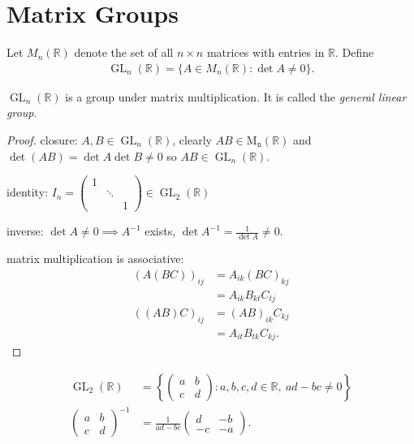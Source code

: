 \section{Matrix Groups}

Let $M_n(\mathbb{R})$ denote the set of all $n \times n$ matrices with entries in $\mathbb{R}$. Define
\begin{align*}
    \operatorname{GL}_n(\mathbb{R}) = \{A \in M_n(\mathbb{R}) : \det A \neq 0\}.
\end{align*} 

\begin{proposition} \label{prp:8}
    $\operatorname{GL}_n(\mathbb{R})$ is a group under matrix multiplication.
    It is called the \emph{general linear group}.
\end{proposition} 

\begin{proof}
    closure: $A, B \in \operatorname{GL}_n(\mathbb{R})$, clearly $AB \in \operatorname{M_n}(\mathbb{R})$ and $\det(AB) = \det A \det B \neq 0$ so $AB \in \operatorname{GL}_n(\mathbb{R})$.

    identity: $I_n = \begin{pmatrix}
        1 & & \\
        & \ddots &  \\
        & & 1
      \end{pmatrix} \in \operatorname{GL}_2(\mathbb{R})$

    inverse: $\det A \neq 0 \implies A^{-1}$ exists, $\det A^{-1} = \frac{1}{\det A} \neq 0$.

    matrix multiplication is associative: 
    \begin{align*}
        (A(BC))_{ij} &= A_{ik} (BC)_{kj} \\
        &= A_{ik} B_{kt} C_{tj} \\
        ((AB)C)_{ij} &= (AB)_{ik} C_{kj} \\
        &= A_{it} B_{tk} C_{kj}.
    \end{align*} 
\end{proof} 

\begin{example}
    \begin{align*}
        \operatorname{GL}_2(\mathbb{R}) &= \left\{ \begin{pmatrix}
        a & b \\
        c & d
        \end{pmatrix} : a, b, c, d \in \mathbb{R},\ ad - bc \neq 0 \right\} \\
        \begin{pmatrix}
            a & b \\
            c & d
            \end{pmatrix}^{-1} &= \frac{1}{ad - bc} \begin{pmatrix}
        d & -b \\
        -c & -a
        \end{pmatrix}.
    \end{align*}
\end{example} 

